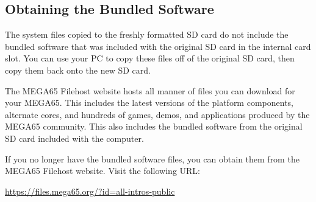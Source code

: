 \subsection{Obtaining the Bundled Software}

The system files copied to the freshly formatted SD card do not include the bundled software that was included with the original SD card in the internal card slot. You can use your PC to copy these files off of the original SD card, then copy them back onto the new SD card.

The MEGA65 Filehost website hosts all manner of files you can download for your MEGA65. This includes the latest versions of the platform components, alternate cores, and hundreds of games, demos, and applications produced by the MEGA65 community. This also includes the bundled software from the original SD card included with the computer.

If you no longer have the bundled software files, you can obtain them from the MEGA65 Filehost website. Visit the following URL:

\url{https://files.mega65.org/?id=all-intros-public}
